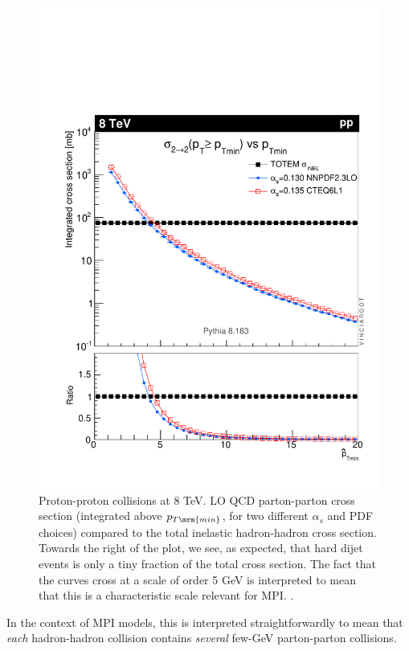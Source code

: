 \begin{figure}[t]
\centering
\includegraphics[scale=0.42]{sigma-8-sigma.pdf}
\caption{Proton-proton collisions at 8 TeV. LO QCD parton-parton
  cross section (integrated above 
  $p_{T\mrm{min}}$, for two different $\alpha_s$ and PDF choices)
  compared to the total inelastic hadron-hadron 
  cross section. Towards the right of the plot, we see, as
  expected, that hard dijet events is only a tiny fraction of the
  total cross section. The fact that the curves cross at a scale of
  order 5 GeV is interpreted to mean that this is a characteristic
  scale relevant for MPI. \cite{Skands:2014pea}.
\label{fig:sigmaQCD}
}
\end{figure}
In the context
of MPI models, this is interpreted straightforwardly 
to mean that \emph{each} hadron-hadron collision
contains \emph{several} few-GeV parton-parton collisions. 

